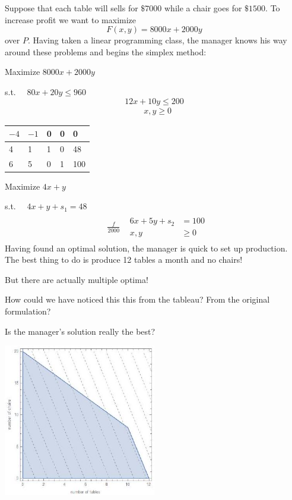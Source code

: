 Suppose that each table will sells for $\$ 7000$ while a chair goes for $\$ 1500 .$ To increase profit we want to maximize
$$
F(x, y)=8000 x+2000 y
$$
over $P$. Having taken a linear programming class, the manager knows his way around these problems and begins the simplex method:

Maximize $8000 x+2000 y$

s.t. $\quad 80 x+20 y \leq 960$
$$
12 x+10 y \leq 200
$$
$$
\begin{aligned}
& x, y \geq 0
\end{aligned}
$$
\begin{tabular}{llll|l}
$-4$ & $-1$ & 0 & 0 & 0 \\
\hline
4 & 1 & 1 & 0 & 48 \\
6 & 5 & 0 & 1 & 100 \\
\end{tabular}

Maximize $4 x+y$

s.t. $\quad 4 x+y+s_{1}=48$
$$
\begin{aligned}
& \begin{aligned}\frac{f}{2000} & \begin{aligned}6 x+5 y+s_{2} &=100 \\x, y & \geq 0\end{aligned}\end{aligned} 
\end{aligned}
$$
Having found an optimal solution, the manager is quick to set up production. The best thing to do is produce 12 tables a month and no chairs!

But there are actually multiple optima!

How could we have noticed this this from the tableau? From the original formulation?

Is the manager's solution really the best?

\includegraphics[width=0.5\textwidth]{optimization/multi-objective/images/2022_02_28_634e8079070800ac7e3cg-05}

